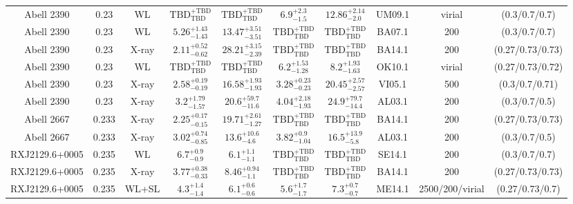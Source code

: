 \begin{table}
\begin{tabular}{cccccccccc}
Abell 2390 & 0.23 & WL & ${\mathrm{TBD}}^{+\mathrm{TBD}}_{\mathrm{TBD}}$ & ${\mathrm{TBD}}^{+\mathrm{TBD}}_{\mathrm{TBD}}$ & ${6.9}^{+2.3}_{-1.5}$ & ${12.86}^{+2.14}_{-2.0}$ & UM09.1 & virial & (0.3/0.7/0.7) \\
Abell 2390 & 0.23 & WL & ${5.26}^{+1.43}_{-1.43}$ & ${13.47}^{+3.51}_{-3.51}$ & ${\mathrm{TBD}}^{+\mathrm{TBD}}_{\mathrm{TBD}}$ & ${\mathrm{TBD}}^{+\mathrm{TBD}}_{\mathrm{TBD}}$ & BA07.1 & 200 & (0.3/0.7/0.7) \\
Abell 2390 & 0.23 & X-ray & ${2.11}^{+0.52}_{-0.62}$ & ${28.21}^{+3.15}_{-2.39}$ & ${\mathrm{TBD}}^{+\mathrm{TBD}}_{\mathrm{TBD}}$ & ${\mathrm{TBD}}^{+\mathrm{TBD}}_{\mathrm{TBD}}$ & BA14.1 & 200 & (0.27/0.73/0.73) \\
Abell 2390 & 0.23 & WL & ${\mathrm{TBD}}^{+\mathrm{TBD}}_{\mathrm{TBD}}$ & ${\mathrm{TBD}}^{+\mathrm{TBD}}_{\mathrm{TBD}}$ & ${6.2}^{+1.53}_{-1.28}$ & ${8.2}^{+1.93}_{-1.63}$ & OK10.1 & virial & (0.27/0.73/0.72) \\
Abell 2390 & 0.23 & X-ray & ${2.58}^{+0.19}_{-0.19}$ & ${16.58}^{+1.93}_{-1.93}$ & ${3.28}^{+0.23}_{-0.23}$ & ${20.45}^{+2.57}_{-2.57}$ & VI05.1 & 500 & (0.3/0.7/0.71) \\
Abell 2390 & 0.23 & X-ray & ${3.2}^{+1.79}_{-1.57}$ & ${20.6}^{+59.7}_{-11.6}$ & ${4.04}^{+2.18}_{-1.93}$ & ${24.9}^{+79.7}_{-14.4}$ & AL03.1 & 200 & (0.3/0.7/0.5) \\
Abell 2667 & 0.233 & X-ray & ${2.25}^{+0.17}_{-0.15}$ & ${19.71}^{+2.61}_{-1.27}$ & ${\mathrm{TBD}}^{+\mathrm{TBD}}_{\mathrm{TBD}}$ & ${\mathrm{TBD}}^{+\mathrm{TBD}}_{\mathrm{TBD}}$ & BA14.1 & 200 & (0.27/0.73/0.73) \\
Abell 2667 & 0.233 & X-ray & ${3.02}^{+0.74}_{-0.85}$ & ${13.6}^{+10.6}_{-4.6}$ & ${3.82}^{+0.9}_{-1.04}$ & ${16.5}^{+13.9}_{-5.8}$ & AL03.1 & 200 & (0.3/0.7/0.5) \\
RXJ2129.6+0005 & 0.235 & WL & ${6.7}^{+0.9}_{-0.9}$ & ${6.1}^{+1.1}_{-1.1}$ & ${\mathrm{TBD}}^{+\mathrm{TBD}}_{\mathrm{TBD}}$ & ${\mathrm{TBD}}^{+\mathrm{TBD}}_{\mathrm{TBD}}$ & SE14.1 & 200 & (0.3/0.7/0.7) \\
RXJ2129.6+0005 & 0.235 & X-ray & ${3.77}^{+0.38}_{-0.33}$ & ${8.46}^{+0.94}_{-1.1}$ & ${\mathrm{TBD}}^{+\mathrm{TBD}}_{\mathrm{TBD}}$ & ${\mathrm{TBD}}^{+\mathrm{TBD}}_{\mathrm{TBD}}$ & BA14.1 & 200 & (0.27/0.73/0.73) \\
RXJ2129.6+0005 & 0.235 & WL+SL & ${4.3}^{+1.4}_{-1.4}$ & ${6.1}^{+0.6}_{-0.6}$ & ${5.6}^{+1.7}_{-1.7}$ & ${7.3}^{+0.7}_{-0.7}$ & ME14.1 & 2500/200/virial & (0.27/0.73/0.7) \\

\end{tabular}
\end{table}
